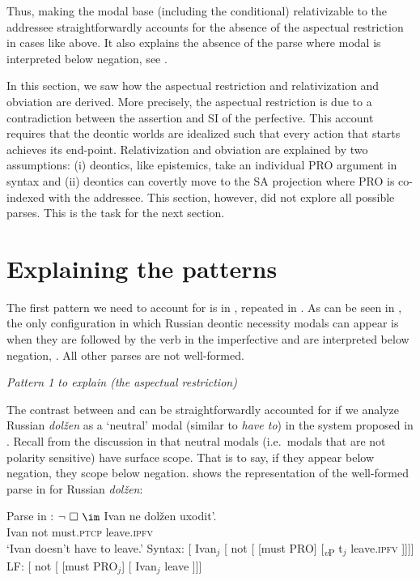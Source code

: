 \documentclass[output=paper,
modfonts,
newtxmath,colorlinks,citecolor=brown
]{langscibook}
\begin{document}
\noindent Thus, making the modal base (including the conditional) relativizable to the addressee straightforwardly accounts for the absence of the aspectual restriction in cases like above. It also explains the absence of the parse where modal is interpreted below negation, see .
 
 In this section, we saw how the aspectual restriction and relativization and obviation are derived. More precisely, the aspectual restriction is due to a contradiction between the assertion and SI of the perfective. This account requires that the deontic worlds are idealized such that every action that starts achieves its end-point. Relativization and obviation are explained by two assumptions: (i) deontics, like epistemics, take an individual PRO argument  in syntax and (ii) deontics can covertly move to the SA projection where PRO is co-indexed with the addressee. This section, however, did not explore all possible parses. This is the task for the next section.
 
 \section{Explaining the patterns}\label{dar}
 The first pattern we need to account for is in , repeated in . As can be seen in , the only configuration in which Russian deontic necessity modals can appear is when they are followed by the verb in the imperfective and are interpreted below negation, . All other parses are not well-formed.
 
 	\ea \textit{Pattern 1 to explain (the aspectual restriction)}\label{arpattern}
	\ea[\ding{51}]{$\neg \ \Box$ \im \label{p1a}}
    \ex[\ding{55}]{$\,\Box\ \neg$ \im \label{p1b}}
    \ex[\ding{55}]{$\,\neg \ \Box$ \p \label{p1c}}
    \ex[\ding{55}]{$\,\Box\ \neg$ \p \label{p1d}}
    \z\z


\noindent  The contrast between  and  can be straightforwardly accounted for if we analyze Russian \textit{dolžen} as a `neutral' modal (similar to \textit{have to}) in the system proposed in \citet{iatzei13}. Recall from the discussion in   that neutral modals (i.e.\ modals that are not polarity sensitive) have surface scope. That is to say, if they appear below negation, they scope below negation.  shows the representation of the well-formed parse in  for Russian \textit{dolžen}:

	\ea Parse in :  $\neg\ \Box\ \im$ \label{detailsp1a}
    		\ea \gll Ivan ne dolžen uxodit'. \\
            	Ivan not must.\textsc{ptcp} leave.\textsc{ipfv}\\
                \glt `Ivan doesn't have to leave.'
			\ex Syntax: [ Ivan$_j$ [ not [ [must PRO] [\textsubscript{\textit{v}P} t$_j$ leave.\textsc{ipfv} ]]]]
            \ex LF: [ not [ [must PRO$_j$]  [ Ivan$_j$ leave ]]] \label{detailsp1ac}
		\z \z
\end{document}

